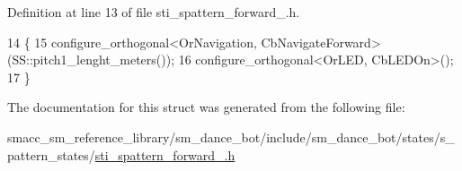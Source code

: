 Definition at line 13 of file sti\+\_\+spattern\+\_\+forward\+\_.\+h.


\begin{DoxyCode}
14   \{
15     configure\_orthogonal<OrNavigation, CbNavigateForward>(SS::pitch1\_lenght\_meters());
16     configure\_orthogonal<OrLED, CbLEDOn>();
17   \}
\end{DoxyCode}


The documentation for this struct was generated from the following file\+:\begin{DoxyCompactItemize}
\item 
smacc\+\_\+sm\+\_\+reference\+\_\+library/sm\+\_\+dance\+\_\+bot/include/sm\+\_\+dance\+\_\+bot/states/s\+\_\+pattern\+\_\+states/\hyperlink{include_2sm__dance__bot_2states_2s__pattern__states_2sti__spattern__forward__3_8h}{sti\+\_\+spattern\+\_\+forward\+\_.\+h}\end{DoxyCompactItemize}
